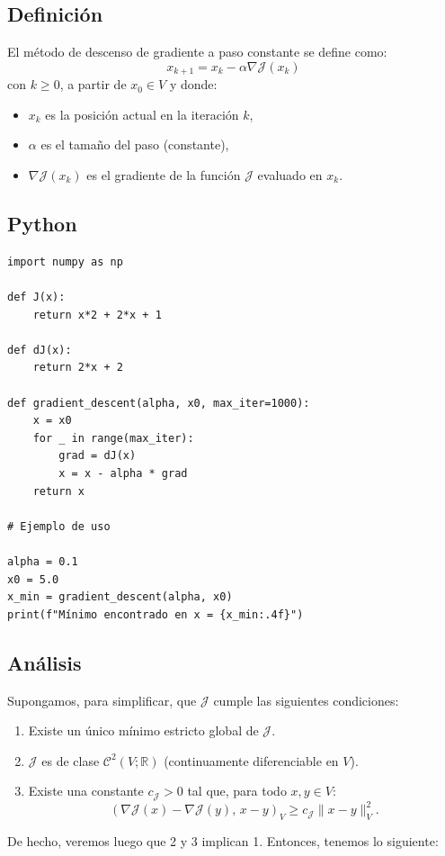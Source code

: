 \documentclass[12pt]{book}
\theoremstyle{definition}
\theoremstyle{plain}
\theoremstyle{remark}
\begin{document}
\subsection{Definición}
El método de {descenso de gradiente a paso constante} se define como:
\begin{equation}
{x}_{k+1} = {x}_k - \alpha \nabla \mathcal{J}({x}_k)    
\end{equation}
con $k\geq0$, a partir de $x_0 \in V$ y
donde:
\begin{itemize}
    \item ${x}_k$ es la posición actual en la iteración $k$,
    \item $\alpha$ es el {tamaño del paso} (constante),
    \item $\nabla \mathcal{J}({x}_k)$ es el gradiente de la función $\mathcal{J}$ evaluado en ${x}_k$.
\end{itemize}

\subsection{Python}

\begin{lstlisting}[style=pythonstyle, caption={Gradiente a paso constante.}, label={lst:g1}]
import numpy as np

def J(x):
    return x*2 + 2*x + 1

def dJ(x):
    return 2*x + 2

def gradient_descent(alpha, x0, max_iter=1000):
    x = x0
    for _ in range(max_iter):
        grad = dJ(x)
        x = x - alpha * grad
    return x

# Ejemplo de uso

alpha = 0.1
x0 = 5.0
x_min = gradient_descent(alpha, x0)
print(f"Mínimo encontrado en x = {x_min:.4f}")
\end{lstlisting}

\subsection{Análisis}

Supongamos, para simplificar, que $\mathcal{J}$ cumple las siguientes condiciones:
\begin{enumerate}
    \item 
   Existe un único mínimo estricto global de $\mathcal{J}$.

\item %
   $\mathcal{J}$ es de clase $\mathscr{C}^2(V;\mathbb{R})$ (continuamente diferenciable en $V$).

\item
   Existe una constante $c_{\mathcal{J}} > 0$ tal que, para todo $x, y \in V$:
   \begin{equation}
       \label{strongconvexity1}
   ( \nabla \mathcal{J}(x) - \nabla \mathcal{J}(y), \, x - y )_V \geq c_{\mathcal{J}} \|x - y\|_V^2.
    \end{equation}
 \end{enumerate}
De hecho, veremos luego que 2 y 3 implican 1.
Entonces, tenemos lo siguiente:
\end{document}
